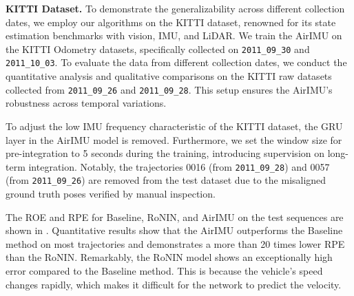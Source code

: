 \begin{table}[t]
    \caption{The P-RMSE of IMU integration over 1 second (200 frames) on EuRoC dataset (Unit: meter).}
    \label{Tab: LIO}
    \centering
\end{table}


\textbf{KITTI Dataset.}
To demonstrate the generalizability across different collection dates, we employ our algorithms on the KITTI dataset\cite{KITTIDataset}, renowned for its state estimation benchmarks with vision, IMU, and LiDAR.
We train the AirIMU on the KITTI Odometry datasets, specifically collected on \texttt{2011\_09\_30} and \texttt{2011\_10\_03}. 
To evaluate the data from different collection dates, we conduct the quantitative analysis and qualitative comparisons on the KITTI raw datasets collected from \texttt{2011\_09\_26} and \texttt{2011\_09\_28}.
This setup ensures the AirIMU's robustness across temporal variations.

To adjust the low IMU frequency characteristic of the KITTI dataset, the GRU layer in the AirIMU model is removed. Furthermore, we set the window size for pre-integration to 5 seconds during the training, introducing supervision on long-term integration. Notably, the trajectories 0016 (from \texttt{2011\_09\_28}) and 0057 (from \texttt{2011\_09\_26}) are removed from the test dataset due to the misaligned ground truth poses verified by manual inspection.

The ROE and RPE for Baseline, RoNIN, and AirIMU on the test sequences are shown in . Quantitative results show that the AirIMU outperforms the Baseline method on most trajectories and demonstrates a more than 20 times lower RPE than the RoNIN. 
Remarkably, the RoNIN model shows an exceptionally high error compared to the Baseline method. This is because the vehicle's speed changes rapidly, which makes it difficult for the network to predict the velocity. 

